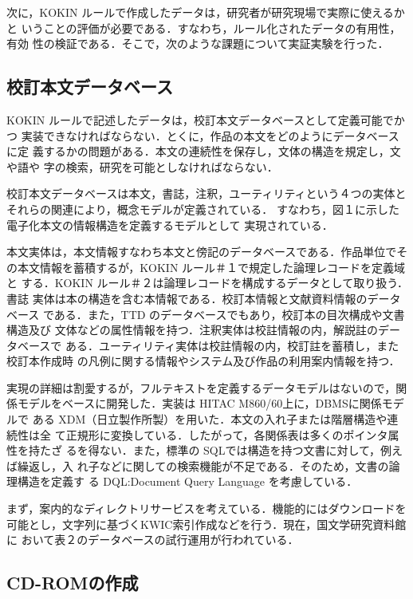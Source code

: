 次に，KOKIN ルールで作成したデータは，研究者が研究現場で実際に使えるかと
いうことの評価が必要である．すなわち，ルール化されたデータの有用性，有効
性の検証である．そこで，次のような課題について実証実験を行った．


\subsection{校訂本文データベース}
\label{sec:5.1setu}

KOKIN ルールで記述したデータは，校訂本文データベースとして定義可能でかつ
実装できなければならない．とくに，作品の本文をどのようにデータベースに定
義するかの問題がある．本文の連続性を保存し，文体の構造を規定し，文や語や
字の検索，研究を可能としなければならない．

校訂本文データベースは本文，書誌，注釈，ユーティリティという４つの実体と
それらの関連により，概念モデルが定義されている\cite{yasunaga:94}．
すなわち，図１に示した電子化本文の情報構造を定義するモデルとして
実現されている．

本文実体は，本文情報すなわち本文と傍記のデータベースである．作品単位でそ
の本文情報を蓄積するが，KOKIN ルール＃１で規定した論理レコードを定義域と
する．KOKIN ルール＃２は論理レコードを構成するデータとして取り扱う．書誌
実体は本の構造を含む本情報である．校訂本情報と文献資料情報のデータベース
である．また，TTD のデータベースでもあり，校訂本の目次構成や文書構造及び
文体などの属性情報を持つ．注釈実体は校註情報の内，解説註のデータベースで
ある．ユーティリティ実体は校註情報の内，校訂註を蓄積し，また校訂本作成時
の凡例に関する情報やシステム及び作品の利用案内情報を持つ．

実現の詳細は割愛するが，フルテキストを定義するデータモデルはないので，関
係モデルをベースに開発した．実装は HITAC M860/60上に，DBMSに関係モデルで
ある XDM（日立製作所製）を用いた．本文の入れ子または階層構造や連続性は全
て正規形に変換している．したがって，各関係表は多くのポインタ属性を持たざ
るを得ない．また，標準の SQLでは構造を持つ文書に対して，例えば繰返し，入
れ子などに関しての検索機能が不足である．そのため，文書の論理構造を定義す
る DQL:Document Query Language\cite{hara:94} を考慮している．

まず，案内的なディレクトリサービスを考えている．機能的にはダウンロードを
可能とし，文字列に基づくKWIC索引作成などを行う．現在，国文学研究資料館に
おいて表２のデータベースの試行運用が行われている．



\subsection{CD-ROMの作成}
\label{sec:5.2setu}


